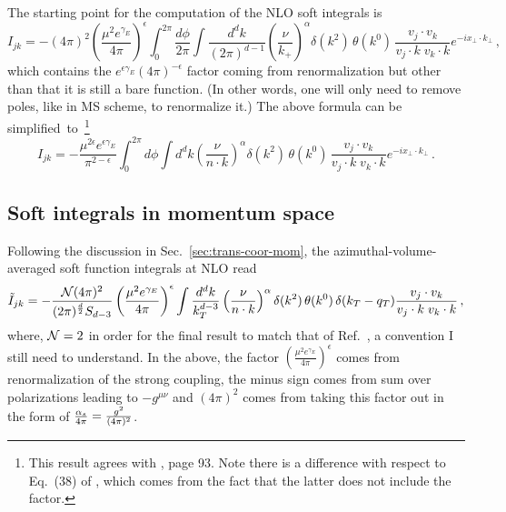 \documentclass[a4paper,11pt]{report}
\numberwithin{equation}{section}
\begin{document}
The starting point for the computation of the NLO soft integrals 
is~\cite{AntoniaMTh}
%
\begin{equation}
  I_{jk} = 
  -(4\pi)^2 
  \left(\frac{\mu^2 e^{\gamma_E}}{4\pi}\right)^\epsilon
  \int_0^{2\pi} \frac{d\phi}{2\pi}
  \int \frac{d^d k}{(2\pi)^{d-1}}
  \left(\frac{\nu}{k_+}\right)^\alpha
  \delta(k^2)\, \theta(k^0)\,
  \frac{v_j \cdot v_k}{v_j \cdot k\; v_k \cdot k}
  e^{-i x_\perp \cdot k_\perp}\,,
\end{equation}
%
which contains the $e^{\epsilon \gamma_E} (4\pi)^{-\epsilon}$ factor coming from
\msbar renormalization but other than that it is still a bare function. (In
other words, one will only need to remove poles, like in MS scheme, to
renormalize it.)
%
The above formula can be simplified~to~\footnote{
This result agrees with \cite{AntoniaMTh}, page 93. Note there is a difference
with respect to Eq.~(38) of \cite{Li:2013mia}, which comes from the fact that
the latter does not include the \msbar factor.}
%
\begin{equation}
  I_{jk} = 
  -\frac{\mu^{2\epsilon} e^{\epsilon \gamma_E}}{\pi^{2-\epsilon}}
  \int_0^{2\pi} d\phi
  \int d^d k
  \left(\frac{\nu}{n\cdot k}\right)^\alpha
  \delta(k^2)\, \theta(k^0)\,
  \frac{v_j \cdot v_k}{v_j \cdot k\; v_k \cdot k}
  e^{-i x_\perp \cdot k_\perp}\,.
  \label{eq:NLOsoft-function-def}
\end{equation}

\subsection{Soft integrals in momentum space}

Following the discussion in Sec.~\ref{sec:trans-coor-mom}, the
azimuthal-volume-averaged soft function integrals at NLO read
%
\begin{equation}
  \tilde I_{jk} = 
  -\frac{{\cal N} (4\pi)^2}{(2\pi)^{\frac{d}{2}} S_{d-3}}
  \left(\frac{\mu^2 e^{\gamma_E}}{4\pi}\right)^\epsilon 
  \int \frac{d^d k}{k_T^{d-3}}
  \left(\frac{\nu}{n\cdot k}\right)^\alpha
  \delta(k^2)\, \theta(k^0)\,
  \delta(k_T - q_T)
  \frac{v_j \cdot v_k}{v_j \cdot k\; v_k \cdot k}\,,
  \label{eq:soft-func-nlo-mom-space-ddim}
\end{equation}
%
where, ${\cal N} = 2 $ in order for the final result to match that of
Ref.~\cite{Li:2013mia}, a convention I still need to understand. 
%
In the above, the
factor $\left(\frac{\mu^2 e^{\gamma_E}}{4\pi}\right)^\epsilon$ comes from
renormalization of the strong coupling, the minus sign comes from sum over
polarizations leading to $-g^{\mu\nu}$ and $(4\pi)^2$ comes from taking this
factor out in the form of $\frac{{\alpha_s}}{4\pi} = \frac{g^2}{(4\pi)^2}$.
\end{document}
